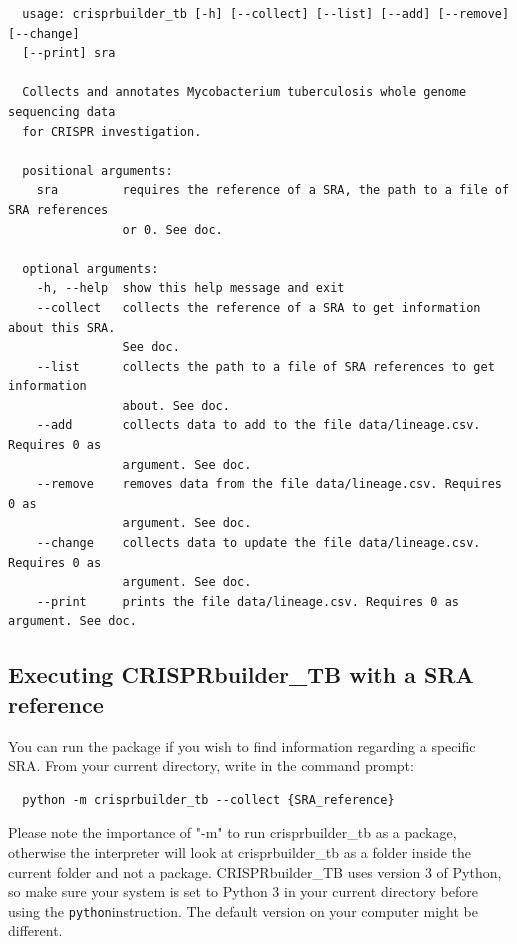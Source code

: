 \documentclass[twoside,a4paper,11pt,frenchb,openany]{report}
\begin{document}
    \begin{verbatim}
  usage: crisprbuilder_tb [-h] [--collect] [--list] [--add] [--remove] [--change]
  [--print] sra

  Collects and annotates Mycobacterium tuberculosis whole genome sequencing data
  for CRISPR investigation.

  positional arguments:
    sra         requires the reference of a SRA, the path to a file of SRA references
                or 0. See doc.

  optional arguments:
    -h, --help  show this help message and exit
    --collect   collects the reference of a SRA to get information about this SRA. 
                See doc.
    --list      collects the path to a file of SRA references to get information 
                about. See doc.
    --add       collects data to add to the file data/lineage.csv. Requires 0 as 
                argument. See doc.
    --remove    removes data from the file data/lineage.csv. Requires 0 as 
                argument. See doc.
    --change    collects data to update the file data/lineage.csv. Requires 0 as
                argument. See doc.
    --print     prints the file data/lineage.csv. Requires 0 as argument. See doc.
\end{verbatim}



    \subsection*{Executing CRISPRbuilder\_TB with a SRA
reference}\label{executing-crisprbuilder_tb-with-a-sra-reference}

    You can run the package if you wish to find information regarding a
specific SRA. From your current directory, write in the command prompt:

    \begin{verbatim}
  python -m crisprbuilder_tb --collect {SRA_reference}
\end{verbatim}

    Please note the importance of "-m" to run crisprbuilder\_tb as a
package, otherwise the interpreter will look at crisprbuilder\_tb as a folder inside the current folder and not a package. CRISPRbuilder\_TB uses version 3 of Python, so make sure your system is set to Python 3 in your current directory before using the
\texttt{python}instruction. The default version on your computer might
be different.
\end{document}
